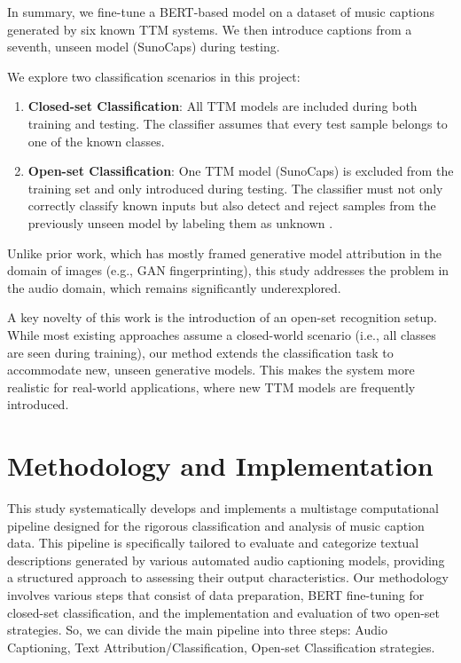\documentclass[conference]{IEEEtran}  %
\begin{document}
In summary, we fine-tune a BERT-based model on a dataset of music captions generated by six known TTM systems. We then introduce captions from a seventh, unseen model (SunoCaps) during testing.

We explore two classification scenarios in this project:

\begin{enumerate}
\item \textbf{Closed-set Classification}: All TTM models are included during both training and testing. The classifier assumes that every test sample belongs to one of the known classes.

\item \textbf{Open-set Classification}: One TTM model (SunoCaps) is excluded from the training set and only introduced during testing. The classifier must not only correctly classify known inputs but also detect and reject samples from the previously unseen model by labeling them as unknown \cite{kong2021opengan}.
\end{enumerate}

Unlike prior work, which has mostly framed generative model attribution in the domain of images (e.g., GAN fingerprinting), this study addresses the problem in the audio domain, which remains significantly underexplored.

A key novelty of this work is the introduction of an open-set recognition setup. While most existing approaches assume a closed-world scenario (i.e., all classes are seen during training), our method extends the classification task to accommodate new, unseen generative models. This makes the system more realistic for real-world applications, where new TTM models are frequently introduced.


\section{Methodology and Implementation}

This study systematically develops and implements a multistage computational pipeline designed for the rigorous classification and analysis of music caption data. This pipeline is specifically tailored to evaluate and categorize textual descriptions generated by various automated audio captioning models, providing a structured approach to assessing their output characteristics. Our methodology involves various steps that consist of data preparation, BERT fine-tuning for closed-set classification, and the implementation and evaluation of two open-set strategies. 
So, we can divide the main pipeline into three steps: Audio Captioning, Text Attribution/Classification, Open-set Classification strategies.
\end{document}
